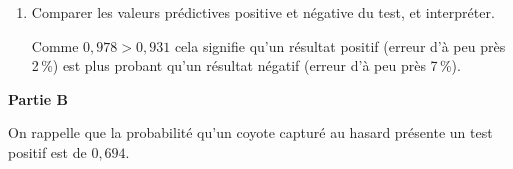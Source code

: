 \documentclass[10pt]{article}
\begin{document}
\begin{enumerate}
\begin{enumerate}
Or $P\left(\overline{T} \cap \overline{M} \right) = P\left(\overline{T}\right) \times P_{\overline{T}}\left(\overline{M}\right)$ ;

$\bullet~~$$P\left(\overline{T}\right) = 1 - P(T) = 1 - 0,694 = 0,306$ ;

$\bullet~~$$P_{\overline{T}}\left(\overline{M}\right) = \dfrac{P\left(\overline{T} \cap \overline{M}\right)}{P\left(\overline{T}\right)} = \dfrac{0,3 \times 0,95}{0,306} \approx 0,9313$, soit 0,931 au millième près.
\item Comparer les valeurs prédictives positive et négative du test, et interpréter.

Comme $0,978 > 0,931$ cela signifie qu'un résultat positif (erreur d'à peu près 2\,\%) est plus probant qu'un résultat négatif (erreur d'à peu près 7\,\%).
	\end{enumerate}	
\end{enumerate}

\bigskip

\textbf{Partie B}

\medskip

On rappelle que la probabilité qu'un coyote capturé au hasard présente un test positif est de $0,694$.

\medskip
\end{document}
